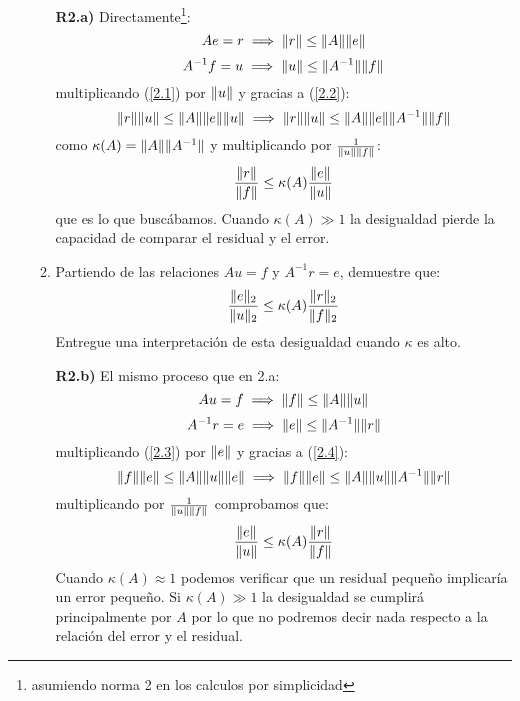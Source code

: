 \documentclass{article}
\DeclarePairedDelimiter{\norm}{\lVert}{\rVert}
\begin{document}
\begin{enumerate}
\begin{enumerate}
        \textbf{R2.a)} Directamente\footnote{asumiendo norma 2 en los calculos por simplicidad}:
        \begin{equation}\label{2.1}
            Ae = r \implies \norm{r} \leq \norm{A}\norm{e}
        \end{equation}
        \begin{equation}\label{2.2}
            A^{-1}f=u \implies \norm{u} \leq \norm{A^{-1}} \norm{f}
        \end{equation}
        multiplicando (\ref{2.1}) por $\norm{u}$ y gracias a (\ref{2.2}):
        $$
            \norm{r} \norm{u} \leq \norm{A}\norm{e} \norm{u} \implies
            \norm{r} \norm{u} \leq \norm{A}\norm{e} \norm{A^{-1}} \norm{f}
        $$
        como $\kappa (A) = \norm{A} \norm{A^{-1}}$ y multiplicando por $\frac{1}{\norm{u}\norm{f}}$:
        \begin{equation}\label{r1}
            \frac{\norm{r}}{\norm{f}} \leq \kappa(A)\frac{\norm{e}}{\norm{u}}    
        \end{equation}
        que es lo que buscábamos.
        Cuando $\kappa(A) \gg 1$  la desigualdad pierde la capacidad de comparar el residual y el error.

        \item Partiendo de las relaciones $Au = f$ y $A^{-1}r = e $, demuestre que:
        $$\frac{\norm{e}_2}{\norm{u}_2} \leq \kappa(A)\frac{\norm{r}_2}{\norm{f}_2}$$
        Entregue una interpretación de esta desigualdad cuando $\kappa$ es alto.
        
        \textbf{R2.b)} El mismo proceso que en 2.a:
        \begin{equation}\label{2.3}
            Au = f \implies \norm{f} \leq \norm{A}\norm{u}
        \end{equation}
        \begin{equation}\label{2.4}
            A^{-1}r=e \implies \norm{e} \leq \norm{A^{-1}} \norm{r}
        \end{equation}
        multiplicando (\ref{2.3}) por $\norm{e}$ y gracias a (\ref{2.4}):
        \begin{equation}\label{r2}
            \norm{f} \norm{e} \leq \norm{A}\norm{u} \norm{e} \implies
            \norm{f} \norm{e} \leq \norm{A}\norm{u} \norm{A^{-1}} \norm{r}
        \end{equation}
        multiplicando por $\frac{1}{\norm{u}\norm{f}}$ comprobamos que:
        $$\frac{\norm{e}}{\norm{u}} \leq \kappa(A)\frac{\norm{r}}{\norm{f}}$$
        Cuando $\kappa(A) \approx 1$ podemos verificar que un residual pequeño implicaría un error pequeño. Si $\kappa(A) \gg 1$ la desigualdad se cumplirá principalmente por $A$ por lo que no podremos decir nada respecto a la relación del error y el residual.
        

\end{enumerate}
\end{enumerate}
\end{document}
